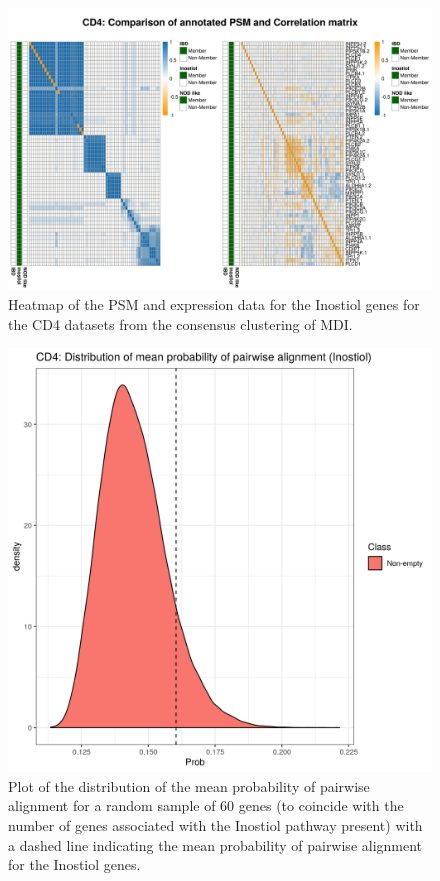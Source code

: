 \documentclass[12pt]{article} %
\begin{document}
		\newpage
	
	\begin{figure}
		\centering
		\includegraphics[scale=0.75]{Images/Biology_data/All_datasets/Heatmaps/KEGG_INOSITOL_PHOSPHATE_METABOLISM/CD4_comp_psm_corr.png}
		\caption{Heatmap of the PSM and expression data for the Inostiol genes for the CD4 datasets from the consensus clustering of MDI.}
		\label{fig:mdi_cd4_inostiol_psm_cor}
	\end{figure}


\begin{figure}[h]
	\centering
	\includegraphics[scale=0.75]{Images/Biology_data/All_datasets/Mean_alignment_probability/CD4_KEGG_INOSITOL_PHOSPHATE_METABOLISM.png}
	\caption{Plot of the distribution of the mean probability of pairwise alignment for a random sample of 60 genes (to coincide with the number of genes associated with the Inostiol pathway present) with a dashed line indicating the mean probability of pairwise alignment for the Inostiol genes.}
	\label{fig:mdi_cd4_inostiol_alignemnt_prob_distn}
\end{figure}
\end{document}
